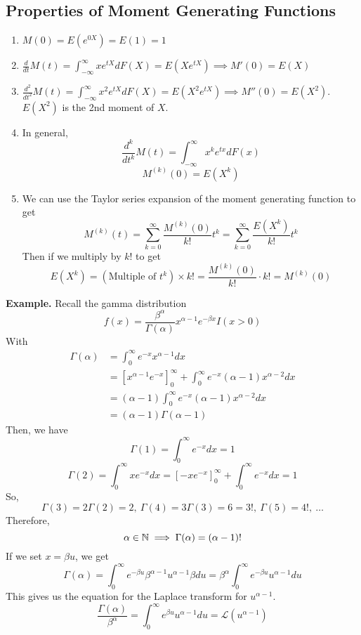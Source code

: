 \subsection{Properties of Moment Generating Functions}
\begin{enumerate}[label=(\roman*)]
    \item $M(0) = E(e^{0X}) = E(1) = 1$
    \item $\frac{d}{dt} M(t) = \int_{-\infty}^\infty xe^{tX}dF(X) = E(Xe^{tX}) \implies M'(0) = E(X)$
    \item $\frac{d^2}{dt^2} M(t) = \int_{-\infty}^\infty x^2e^{tX}dF(X) = E(X^2e^{tX}) \implies M''(0) = E(X^2)$. $E(X^2)$ is the 2nd moment of $X$.
    \item In general, 
    \[\frac{d^k}{dt^k} M(t) = \int_{-\infty}^\infty x^ke^{tx}dF(x)\]
    \[M^{(k)}(0) = E(X^k)\]
    \item We can use the Taylor series expansion of the moment generating function to get 
    \[M^{(k)}(t) = \sum_{k=0}^\infty \frac{M^{(k)}(0)}{k!}t^k = \sum_{k=0}^\infty \frac{E(X^k)}{k!}t^k\]
    Then if we multiply by $k!$ to get 
    \[E(X^k) = (\text{Multiple of $t^k$}) \times k! = \frac{M^{(k)}(0)}{k!} \cdot k! = M^{(k)}(0)\]
\end{enumerate}
\noindent
\textbf{Example.} Recall the gamma distribution 
\[f(x) = \frac{\beta^\alpha}{\Gamma(\alpha)}x^{\alpha-1}e^{-\beta x}I(x > 0)\]
With 
\begin{align*}
    \Gamma(\alpha) &= \int_0^\infty e^{-x}x^{\alpha-1}dx\\ 
    &= \left[x^{\alpha -1}e^{-x}\right]_0^{\infty} + \int_0^\infty e^{-x}(\alpha - 1)x^{\alpha -2}dx\\ 
    &= (\alpha - 1)\int_0^\infty e^{-x}(\alpha - 1)x^{\alpha -2}dx\\
    &= (\alpha - 1)\Gamma(\alpha - 1)
\end{align*}
Then, we have 
\[\Gamma(1) = \int_0^\infty e^{-x}dx = 1\]
\[\Gamma(2) = \int_0^\infty xe^{-x}dx = \left[-xe^{-x}\right]_0^\infty + \int_0^\infty e^{-x}dx = 1\]
So, 
\[\Gamma(3) = 2\Gamma(2) = 2, \ \Gamma(4) = 3 \Gamma(3) = 6 = 3!, \ \Gamma(5) = 4!, \ \ldots\]
Therefore,
\[\alpha \in \mathbb{N} \implies \Gamma(\alpha) = (\alpha-1)!\]
If we set $x = \beta u$, we get 
\[\Gamma(\alpha) = \int_0^\infty e^{-\beta u}\beta^{\alpha -1}u^{\alpha-1}\beta du = \beta^\alpha \int_0^\infty e^{-\beta u}u^{\alpha -1}du\]
This gives us the equation for the Laplace transform for $u^{\alpha -1}$. 
\[\frac{\Gamma(\alpha)}{\beta^\alpha} = \int_0^\infty e^{\beta u}u^{\alpha - 1}du = \mathcal{L}(u^{\alpha -1})\]

